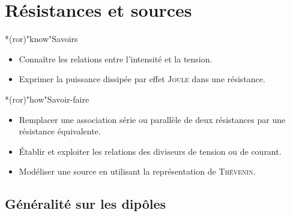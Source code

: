 \documentclass[../../main/main.tex]{subfiles}
\begin{document}
\setcounter{chapter}{1}

\chapter{R\'esistances et sources}

\vfill

\begin{prgm}
	\begin{tcb}*(ror)"know"{Savoirs}
		\begin{itemize}[label=$\diamond$, leftmargin=10pt]
			\item Connaître les relations entre l'intensité et la tension.
			\item Exprimer la puissance dissipée par effet \textsc{Joule} dans une
			      résistance.
		\end{itemize}
	\end{tcb}

	\begin{tcb}*(ror)"how"{Savoir-faire}
		\begin{itemize}[label=$\diamond$, leftmargin=10pt]
			\item Remplacer une association série ou parallèle de deux
			      résistances par une résistance équivalente.
			\item Établir et exploiter les relations des diviseurs de
			      tension ou de courant.
			\item Modéliser une source en utilisant la représentation de
			      \textsc{Thévenin}.
		\end{itemize}
	\end{tcb}
\end{prgm}

\vfill
\minitoc
\vfill

\newpage

\section{Généralité sur les dipôles}
\end{document}
